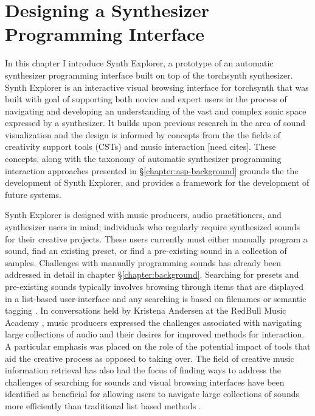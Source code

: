 \graphicspath{{./}{./figures/}{./figures/synthexplore/}}




\chapter{Designing a Synthesizer Programming Interface}
\label{chapter:synth-explore}

In this chapter I introduce Synth Explorer, a prototype of an automatic synthesizer programming interface built on top of the torchsynth synthesizer. Synth Explorer is an interactive visual browsing interface for torchsynth that was built with goal of supporting both novice and expert users in the process of navigating and developing an understanding of the vast and complex sonic space expressed by a synthesizer. It builds upon previous research in the area of sound visualization and the design is informed by concepts from the the fields of creativity support tools (CSTs) and music interaction [need cites]. These concepts, along with the taxonomy of automatic synthesizer programming interaction approaches presented in \S\ref{chapter:asp-background} grounds the the development of Synth Explorer, and provides a framework for the development of future systems. %

Synth Explorer is designed with music producers, audio practitioners, and synthesizer users in mind; individuals who regularly require synthesized sounds for their creative projects. These users currently must either manually program a sound, find an existing preset, or find a pre-existing sound in a collection of samples. Challenges with manually programming sounds has already been addressed in detail in chapter \S\ref{chapter:background}. Searching for presets and pre-existing sounds typically involves browsing through items that are displayed in a list-based user-interface and any searching is based on filenames or semantic tagging \cite{knees2016searching}. In conversations held by Kristena Andersen at the RedBull Music Academy \cite{andersen2016conversations}, music producers expressed the challenges associated with navigating large collections of audio and their desires for improved methods for interaction. A particular emphasis was placed on the role of the potential impact of tools that aid the creative process as opposed to taking over. The field of creative music information retrieval has also had the focus of finding ways to address the challenges of searching for sounds \cite{humphrey2013brief} and visual browsing interfaces have been identified as beneficial for allowing users to navigate large collections of sounds more efficiently than traditional list based methods \cite{turquois2016exploring}.

